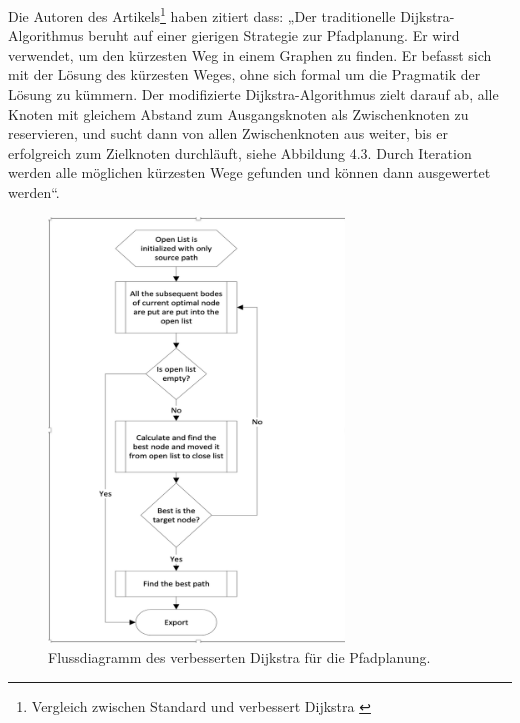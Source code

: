 Die Autoren des Artikels\footnote{Vergleich zwischen Standard und verbessert Dijkstra \cite{vehicles3030027}} haben zitiert dass:
„Der traditionelle Dijkstra-Algorithmus beruht auf einer gierigen Strategie zur Pfadplanung. Er wird verwendet, um den kürzesten Weg in einem Graphen zu finden. Er befasst sich mit der Lösung des kürzesten Weges, ohne sich formal um die Pragmatik der Lösung zu kümmern.
\newline
\newline
 Der modifizierte Dijkstra-Algorithmus zielt darauf ab, alle Knoten mit gleichem Abstand zum Ausgangsknoten als Zwischenknoten zu reservieren, und sucht dann von allen Zwischenknoten aus weiter, bis er erfolgreich zum Zielknoten durchläuft, siehe Abbildung 4.3. Durch Iteration werden alle möglichen kürzesten Wege gefunden und können dann ausgewertet werden“.

\begin{figure}[H]
	\centering
	\includegraphics[width=0.7\textwidth]{images/Activity_robot.PNG}
	\caption{\label{fig:Robot}Flussdiagramm des verbesserten Dijkstra für die Pfadplanung\cite{vehicles3030027}.}
\end{figure}

